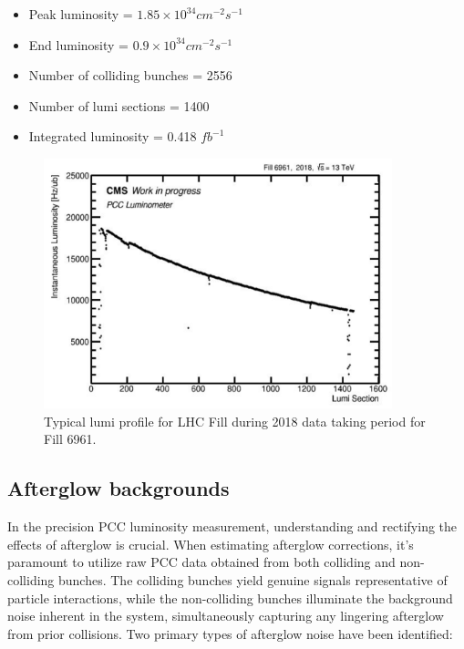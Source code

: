 \begin{itemize}
  
\item Peak luminosity = $1.85 \times 10^{34} cm^{-2} s^{-1}$
\item End luminosity = $0.9 \times 10^{34} cm^{-2} s^{-1}$ 
\item Number of colliding bunches = 2556
\item Number of lumi sections = 1400
\item Integrated luminosity = 0.418 $fb^{-1}$

\end{itemize}
    
\begin{figure}[!htp]
    \centering
    \includegraphics[width=0.9\textwidth]{ashish_thesis/Fill_profile_6961_1.png}
    \caption[Fill 6961 Profile]{Typical lumi profile for LHC Fill during 2018 data taking period for Fill 6961.}
    \label{fig:Fill6961}
\end{figure}


\newpage
\subsection{Afterglow backgrounds}

In the precision PCC luminosity measurement, understanding and rectifying the effects of afterglow is crucial. When estimating afterglow corrections, it's paramount to utilize raw PCC data obtained from both colliding and non-colliding bunches. The colliding bunches yield genuine signals representative of particle interactions, while the non-colliding bunches illuminate the background noise inherent in the system, simultaneously capturing any lingering afterglow from prior collisions. Two primary types of afterglow noise have been identified:

